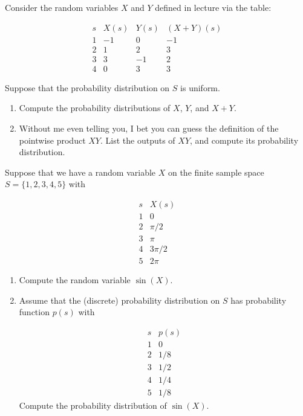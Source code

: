 \documentclass[12pt,reqno]{amsart}
\begin{document}
\newpage
\prob Consider the random variables $X$ and $Y$ defined in lecture via the table:

	\[
	\begin{array}{c|ccc}
	s & X(s) & Y(s) & (X+Y)(s) \\ \hline
	1 & -1 & 0 & -1 \\
	2 & 1 & 2 & 3 \\
	3 & 3 & -1 & 2 \\
	4 & 0 & 3 & 3
	\end{array}
	\]

Suppose that the probability distribution on $S$ is uniform.

\medskip
\begin{enumerate}
\item Compute the probability distributions of $X$, $Y$, and $X+Y$.\vfill
\item Without me even telling you, I bet you can guess the definition of the pointwise product $XY$. List the outputs of $XY$, and compute its probability distribution.\vfill
\end{enumerate}
    











\bigskip
\prob Suppose that we have a random variable $X$ on the finite sample space $S = \{1,2,3,4,5\}$ with

	\[\begin{array}{c|c}
	s & X(s)  \\ \hline
	1 & 0  \\
	2 & \pi/2  \\
	3 & \pi \\
	4 & 3\pi/2 \\
	5 & 2\pi
	\end{array}
	\]

\medskip
\begin{enumerate}
\item Compute the random variable $\sin{(X)}$.\vfill
\item Assume that the (discrete) probability distribution on $S$ has probability function $p(s)$ with

	\[
	\begin{array}{c|c}
	s & p(s)  \\ \hline
	1 & 0  \\
	2 & 1/8  \\
	3 & 1/2 \\
	4 & 1/4 \\
	5 & 1/8
	\end{array}
	\]
Compute the probability distribution of $\sin(X)$.\vfill
\end{enumerate}
\end{document}
